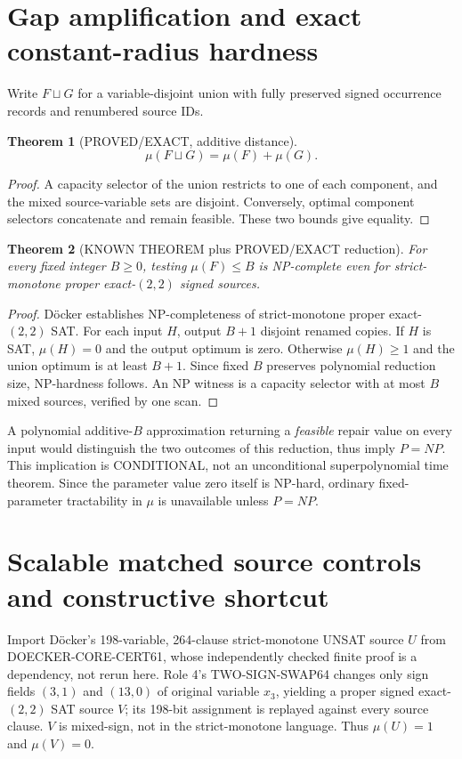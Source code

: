 \documentclass[11pt]{article}
\newtheorem{theorem}{Theorem}
\begin{document}
\section{Gap amplification and exact constant-radius hardness}
Write $F\sqcup G$ for a variable-disjoint union with fully preserved signed occurrence records and renumbered source IDs.
\begin{theorem}[PROVED/EXACT, additive distance]
\[
\mu(F\sqcup G)=\mu(F)+\mu(G).
\]
\end{theorem}
\begin{proof}
A capacity selector of the union restricts to one of each component, and the mixed source-variable sets are disjoint. Conversely, optimal component selectors concatenate and remain feasible. These two bounds give equality.
\end{proof}

\begin{theorem}[KNOWN THEOREM plus PROVED/EXACT reduction]
For every fixed integer $B\ge0$, testing $\mu(F)\le B$ is NP-complete even for strict-monotone proper exact-$(2,2)$ signed sources.
\end{theorem}
\begin{proof}
D\"ocker establishes NP-completeness of strict-monotone proper exact-$(2,2)$ SAT. For each input $H$, output $B+1$ disjoint renamed copies. If $H$ is SAT, $\mu(H)=0$ and the output optimum is zero. Otherwise $\mu(H)\ge1$ and the union optimum is at least $B+1$. Since fixed $B$ preserves polynomial reduction size, NP-hardness follows. An NP witness is a capacity selector with at most $B$ mixed sources, verified by one scan.
\end{proof}
A polynomial additive-$B$ approximation returning a \emph{feasible} repair value on every input would distinguish the two outcomes of this reduction, thus imply $P=NP$. This implication is CONDITIONAL, not an unconditional superpolynomial time theorem. Since the parameter value zero itself is NP-hard, ordinary fixed-parameter tractability in $\mu$ is unavailable unless $P=NP$.

\section{Scalable matched source controls and constructive shortcut}
Import D\"ocker's 198-variable, 264-clause strict-monotone UNSAT source $U$ from DOECKER-CORE-CERT61, whose independently checked finite proof is a dependency, not rerun here. Role 4's TWO-SIGN-SWAP64 changes only sign fields $(3,1)$ and $(13,0)$ of original variable $x_3$, yielding a proper signed exact-$(2,2)$ SAT source $V$; its 198-bit assignment is replayed against every source clause. $V$ is mixed-sign, not in the strict-monotone language. Thus $\mu(U)=1$ and $\mu(V)=0$.
\end{document}

